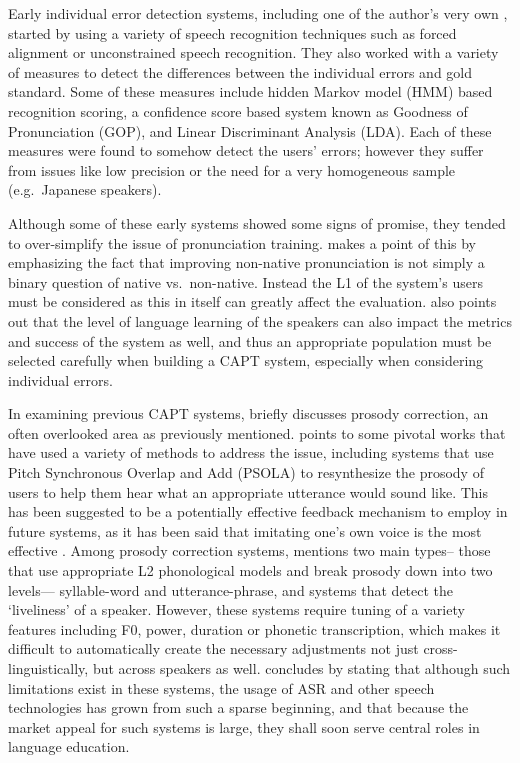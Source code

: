 \documentclass
[
    a4paper,
    twoside,
    12pt,
]
{report}
\begin{document}
Early individual error detection systems, including one of the author's
very own \textcite{eskenazi1998}, started by using a variety of speech
recognition techniques such as forced alignment or unconstrained speech
recognition. They also worked with a variety of measures to detect the
differences between the individual errors and gold standard. Some of
these measures include hidden Markov model (HMM) based recognition
scoring, a confidence score based system known as Goodness of
Pronunciation (GOP), and Linear Discriminant Analysis (LDA). Each of
these measures were found to somehow detect the users' errors; however
they suffer from issues like low precision or the need for a very
homogeneous sample (e.g.~Japanese speakers).

Although some of these early systems showed some signs of promise, they
tended to over-simplify the issue of pronunciation training.
\textcite{eskenazi2009} makes a point of this by emphasizing the fact
that improving non-native pronunciation is not simply a binary question
of native vs.~non-native. Instead the L1 of the system's users must be
considered as this in itself can greatly affect the evaluation.
\textcite{eskenazi2009} also points out that the level of language
learning of the speakers can also impact the metrics and success of the
system as well, and thus an appropriate population must be selected
carefully when building a CAPT system, especially when considering
individual errors.

In examining previous CAPT systems, \textcite{eskenazi2009} briefly
discusses prosody correction, an often overlooked area as previously
mentioned. \textcite{eskenazi2009} points to some pivotal works that
have used a variety of methods to address the issue, including systems
that use Pitch Synchronous Overlap and Add (PSOLA) to resynthesize the
prosody of users to help them hear what an appropriate utterance would
sound like. This has been suggested to be a potentially effective
feedback mechanism to employ in future systems, as it has been said that
imitating one's own voice is the most effective \parencite{felps2009}.
Among prosody correction systems, \textcite{eskenazi2009} mentions two
main types-- those that use appropriate L2 phonological models and break
prosody down into two levels--- syllable-word and utterance-phrase, and
systems that detect the `liveliness' of a speaker. However, these
systems require tuning of a variety features including F0, power,
duration or phonetic transcription, which makes it difficult to
automatically create the necessary adjustments not just
cross-linguistically, but across speakers as well.
\textcite{eskenazi2009} concludes by stating that although such
limitations exist in these systems, the usage of ASR and other speech
technologies has grown from such a sparse beginning, and that because
the market appeal for such systems is large, they shall soon serve
central roles in language education.
\end{document}
